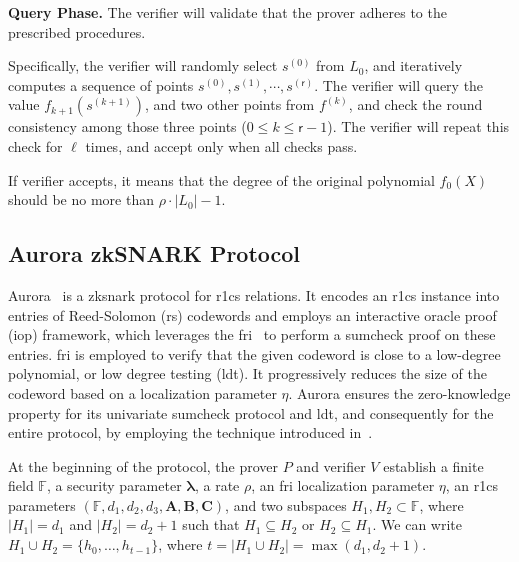 \noindent\textbf{Query Phase.}
The verifier will validate that the prover adheres to the prescribed procedures.

Specifically, the verifier will randomly select $s^{(0)}$ from $L_0$, and iteratively computes a sequence of points $s^{(0)}, s^{(1)}, \cdots , s^{(\mathsf{r})}$. The verifier will query the value $f_{k+1}(s^{(k+1)})$, and two other points from $f^{(k)}$, and check the round consistency among those three points ($0\le k\le \mathsf{r} -1$). The verifier will repeat this check for $\ell$ times, and accept only when all checks pass.

If verifier accepts, it means that the degree of the original polynomial $f_0(X)$ should be no more than $\rho\cdot |L_{0}| -1$.


\subsection{Aurora zkSNARK Protocol}\label{sec:prel_aurora}


Aurora~\cite{Aurora2019} is a \gls{zksnark} protocol for \gls{r1cs} relations. It encodes an \gls{r1cs} instance into entries of Reed-Solomon (\gls{rs}) codewords and employs an interactive oracle proof (\gls{iop}) framework, which leverages the \gls{fri}~\cite{FRI2018} to perform a sumcheck proof on these entries. \gls{fri} is employed to verify that the given codeword is close to a low-degree polynomial, or low degree testing (\gls{ldt}). It progressively reduces the size of the codeword based on a localization parameter $\eta$. Aurora ensures the zero-knowledge property for its univariate sumcheck protocol and \gls{ldt}, and consequently for the entire protocol, by employing the technique introduced in~\cite{Ben-Sasson2016Zero-Knowledge}.

At the beginning of the protocol, the prover $P$ and verifier $V$ establish a finite field \( \mathbb{F} \), a security parameter $\boldsymbol{\lambda}$, a rate $\rho$, an \gls{fri} localization parameter $\eta$, an \gls{r1cs} parameters
\(
(\mathbb{F}, d_1, d_2, d_3, \mathbf{A}, \mathbf{B}, \mathbf{C})
\),
 and two subspaces \( H_1, H_2 \subset \mathbb{F} \), where \( |H_1| = d_1 \) and \( |H_2| = d_2 + 1 \) such that $H_1 \subseteq H_2$ or $H_2 \subseteq H_1$. We can write $H_1 \cup H_2 = \{h_0, \dots, h_{t-1}\}$, where $t = |H_1 \cup H_2| = \max(d_1, d_2+1)$. 

